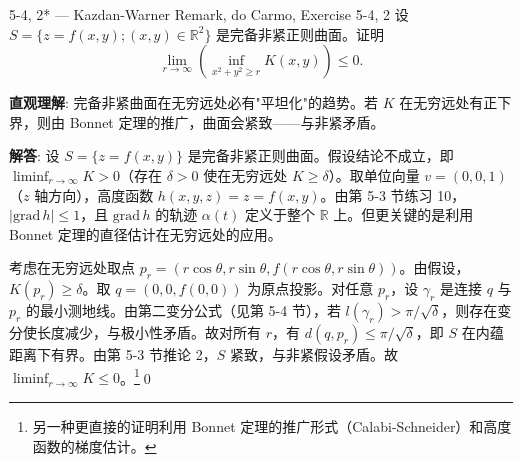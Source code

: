 \begin{exercise}{5-4, 2* — Kazdan-Warner Remark, do Carmo, Exercise 5-4, 2}
设 $S = \{z=f(x,y); (x,y)\in\mathbb{R}^2\}$ 是完备非紧正则曲面。证明
\[
\lim_{r\to\infty}\left(\inf_{x^2+y^2\geq r}K(x,y)\right) \leq 0.
\]
\end{exercise}
\begin{solution}
\textbf{直观理解}: 完备非紧曲面在无穷远处必有"平坦化"的趋势。若 $K$ 在无穷远处有正下界，则由 Bonnet 定理的推广，曲面会紧致——与非紧矛盾。

\textbf{解答}: 设 $S = \{z = f(x,y)\}$ 是完备非紧正则曲面。假设结论不成立，即 $\liminf_{r\to\infty} K > 0$（存在 $\delta > 0$ 使在无穷远处 $K \geq \delta$）。取单位向量 $v = (0,0,1)$（$z$ 轴方向），高度函数 $h(x,y,z) = z = f(x,y)$。由第 5-3 节练习 10，$|\mathrm{grad}\,h| \leq 1$，且 $\mathrm{grad}\,h$ 的轨迹 $\alpha(t)$ 定义于整个 $\mathbb{R}$ 上。但更关键的是利用 Bonnet 定理的直径估计在无穷远处的应用。

考虑在无穷远处取点 $p_r = (r\cos\theta, r\sin\theta, f(r\cos\theta, r\sin\theta))$。由假设，$K(p_r) \geq \delta$。取 $q = (0,0,f(0,0))$ 为原点投影。对任意 $p_r$，设 $\gamma_r$ 是连接 $q$ 与 $p_r$ 的最小测地线。由第二变分公式（见第 5-4 节），若 $l(\gamma_r) > \pi/\sqrt{\delta}$，则存在变分使长度减少，与极小性矛盾。故对所有 $r$，有 $d(q,p_r) \leq \pi/\sqrt{\delta}$，即 $S$ 在内蕴距离下有界。由第 5-3 节推论 2，$S$ 紧致，与非紧假设矛盾。故 $\liminf_{r\to\infty} K \leq 0$。\footnote{另一种更直接的证明利用 Bonnet 定理的推广形式（Calabi-Schneider）和高度函数的梯度估计。}\qed
\end{solution}


